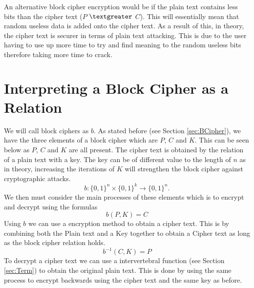 \documentclass[11pt,a4paper, notitlepage]{report}
\begin{document}
An alternative block cipher encryption would be if the plain text contains less bits than the cipher text ($P$ $\textgreater$ $C$). %
This will essentially mean that random useless data is added onto the cipher text. As a result of this, in theory, the cipher text is securer in terms of plain text attacking. This is due to the user having to use up more time to try and find meaning to the random useless bits therefore taking more time to crack.

\section{Interpreting a Block Cipher as a Relation}
\label{sec:ExampleBlock}

We will call block ciphers as $b$. As stated before (see Section \ref{sec:BCipher}), we have the three elements of a block cipher which are $P$, $C$ and $K$. This can be seen below as $P$, $C$ and $K$ are all present. The cipher text is obtained by the relation of a plain text with a key. The key can be of different value to the length of $n$ as in theory, increasing the iterations of $K$ will strengthen the block cipher against cryptographic attacks.  
\begin{displaymath}
b: \{0,1\}^n \times \{0,1\}^k \rightarrow \{0,1\}^n.
\end{displaymath}
We then must consider the main processes of these elements which is to encrypt and decrypt using the formulas
\begin{displaymath}
b (P,K) = C
\end{displaymath}
Using $b$ we can use a encryption method to obtain a cipher text. This is by combining both the Plain text and a Key together to obtain a Cipher text as long as the block cipher relation holds.  
\begin{displaymath}
b^{-1}(C, K) = P
\end{displaymath}
To decrypt a cipher text we can use a intervertebral function (see Section \ref{sec:Term}) to obtain the original plain text. This is done by using the same process to encrypt backwards using the cipher text and the same key as before. 
 
\end{document}
